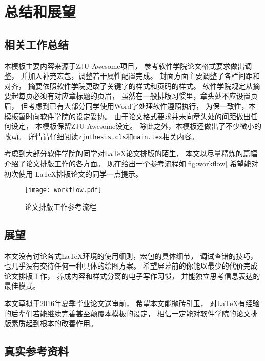 
\chapter{总结和展望}

\section{相关工作总结}

本模板主要内容来源于ZJU-Awesome项目，
参考软件学院论文格式要求做出调整，
并加入补充宏包，调整若干属性配置完成。
封面方面主要调整了各栏间距和对齐，
摘要依照软件学院更改了关键字的样式和页码的样式。
软件学院规定从摘要起每页必须有对应章标题的页眉，
虽然在一般排版习惯里，章头处不应设置页眉，
但考虑到已有大部分同学使用Word字处理软件遵照执行，
为保一致性，本模板暂时向软件学院的设定妥协。
由于论文格式要求并未向章头处的间距做出任何设定，
本模板保留ZJU-Awesome设定。
除此之外，本模板还做出了不少微小的改动。
详情请仔细阅读\texttt{zjuthesis.cls}和\texttt{main.tex}相关内容。

考虑到大部分软件学院的同学对\LaTeX 论文排版的陌生，
本文以尽量精炼的篇幅介绍了论文排版工作的各方面。
现在给出一个参考流程如\autoref{fig:workflow} 希望能对初次使用
\LaTeX 排版论文的同学一点提示。

\begin{figure}[htbp]
    \centering
    \texttt{[image: workflow.pdf]}
    \caption{论文排版工作参考流程}
    \label{fig:workflow}
\end{figure}

\section{展望}

本文没有讨论各式\LaTeX 环境的使用细则，宏包的具体细节，
调试查错的技巧，也几乎没有交待任何一种具体的绘图方案。
希望屏幕前的你能以最少的代价完成论文排版工作，
养成内容和样式分离的电子写作习惯，
并能独立思考信息表达的最佳模式。

本文草拟于2016年夏季毕业论文送审前，
希望本文能抛砖引玉，
对\LaTeX 有经验的后辈们若能继续完善甚至颠覆本模板的设定，
相信一定能对软件学院的论文排版素质起到根本的改善作用。

\section{真实参考资料}

